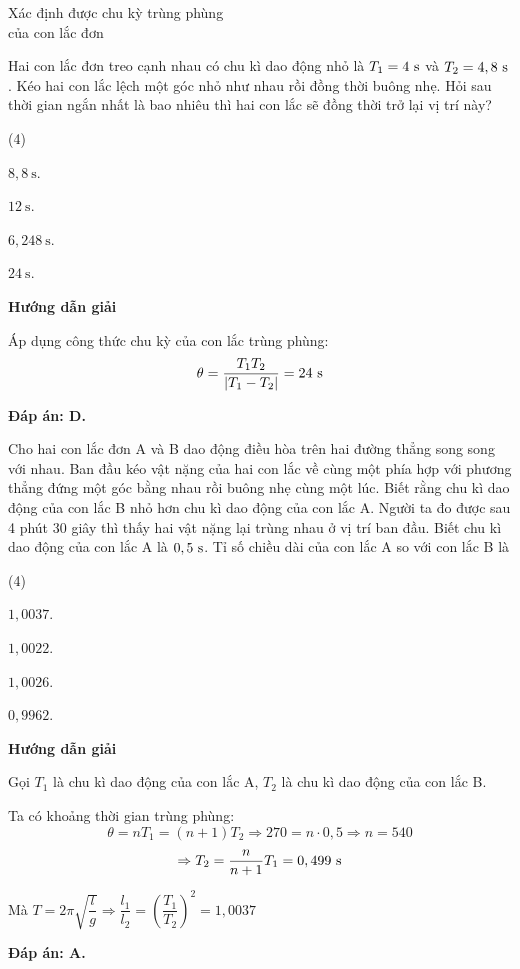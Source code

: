 \begin{dang}{Xác định được chu kỳ trùng phùng\\ của con lắc đơn}
	{
		Hai con lắc đơn treo cạnh nhau có chu kì dao động nhỏ là $T_1=4\ \text s$ và $T_2=4,8\ \text s$. Kéo hai con lắc lệch một góc nhỏ như nhau rồi đồng thời buông nhẹ. Hỏi sau thời gian ngắn nhất là bao nhiêu thì hai con lắc sẽ đồng thời trở lại vị trí này?
		\begin{mcq}(4)
			\item $8,8\ \text{s}$.
			\item $12\ \text{s}$.
			\item $6,248\ \text{s}$.
			\item $24\ \text{s}$.
		\end{mcq}
	}
	{\begin{center}
			\textbf{Hướng dẫn giải}
		\end{center}
		
		Áp dụng công thức chu kỳ của con lắc trùng phùng:
		$$\theta = \dfrac{T_1T_2}{|T_1 - T_2|} = 24\ \text s$$
		
		\textbf{Đáp án: D.}
	}
	{
		Cho hai con lắc đơn A và B dao động điều hòa trên hai đường thẳng song song với nhau. Ban đầu kéo vật nặng của hai con lắc về cùng một phía hợp với phương thẳng đứng một góc bằng nhau rồi buông nhẹ cùng một lúc. Biết rằng chu kì dao động của con lắc B nhỏ hơn chu kì dao động của con lắc A. Người ta đo được sau 4 phút 30 giây thì thấy hai vật nặng lại trùng nhau ở vị trí ban đầu. Biết chu kì dao động của con lắc A là $0,5\ \text s$. Tỉ số chiều dài của con lắc A so với con lắc B là
		\begin{mcq}(4)
			\item $1,0037$.
			\item $1,0022$.
			\item $1,0026$.
			\item $0,9962$.
		\end{mcq}
	}
	{
		\begin{center}
			\textbf{Hướng dẫn giải}
		\end{center}
		
		Gọi $T_1$ là chu kì dao động của con lắc A, $T_2$ là chu kì dao động của con lắc B.
		
		Ta có khoảng thời gian trùng phùng: $$\theta = nT_1 = (n+1)T_2 \Rightarrow 270 = n\cdot 0,5 \Rightarrow n=540$$
		$$\Rightarrow T_2 = \dfrac{n}{n+1}T_1 = 0,499\ \text s$$
		
		Mà $T=2\pi \sqrt{\dfrac{l}{g}}\Rightarrow \dfrac{l_1}{l_2} = \left(\dfrac{T_1}{T_2}\right)^2 = 1,0037$
		
		\textbf{Đáp án: A.}
	}
\end{dang}
